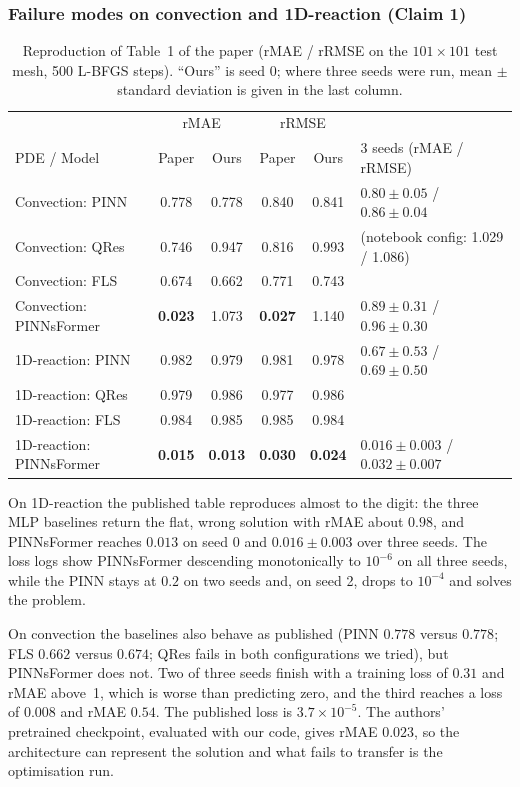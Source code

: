 \documentclass[10pt]{article} %
\begin{document}
\subsubsection{Failure modes on convection and 1D-reaction (Claim 1)}
\begin{table}[ht]
\caption{Reproduction of Table~1 of the paper (rMAE / rRMSE on the $101\times101$ test mesh, 500 L-BFGS steps). ``Ours'' is seed 0; where three seeds were run, mean $\pm$ standard deviation is given in the last column.}
\label{tab:table1}
\begin{center}
\small
\begin{tabular}{l cc cc l}
\toprule
 & \multicolumn{2}{c}{rMAE} & \multicolumn{2}{c}{rRMSE} & \\
PDE / Model & Paper & Ours & Paper & Ours & 3 seeds (rMAE / rRMSE) \\
\midrule
Convection: PINN        & 0.778 & 0.778 & 0.840 & 0.841 & $0.80\pm0.05$ / $0.86\pm0.04$ \\
Convection: QRes        & 0.746 & 0.947 & 0.816 & 0.993 & (notebook config: 1.029 / 1.086) \\
Convection: FLS         & 0.674 & 0.662 & 0.771 & 0.743 & \\
Convection: PINNsFormer & \textbf{0.023} & 1.073 & \textbf{0.027} & 1.140 & $0.89\pm0.31$ / $0.96\pm0.30$ \\
\midrule
1D-reaction: PINN        & 0.982 & 0.979 & 0.981 & 0.978 & $0.67\pm0.53$ / $0.69\pm0.50$ \\
1D-reaction: QRes        & 0.979 & 0.986 & 0.977 & 0.986 & \\
1D-reaction: FLS         & 0.984 & 0.985 & 0.985 & 0.984 & \\
1D-reaction: PINNsFormer & \textbf{0.015} & \textbf{0.013} & \textbf{0.030} & \textbf{0.024} & $0.016\pm0.003$ / $0.032\pm0.007$ \\
\bottomrule
\end{tabular}
\end{center}
\end{table}

On 1D-reaction the published table reproduces almost to the digit: the three MLP baselines return the flat, wrong solution with rMAE about $0.98$, and PINNsFormer reaches $0.013$ on seed 0 and $0.016\pm0.003$ over three seeds. The loss logs show PINNsFormer descending monotonically to $10^{-6}$ on all three seeds, while the PINN stays at $0.2$ on two seeds and, on seed 2, drops to $10^{-4}$ and solves the problem.

On convection the baselines also behave as published (PINN $0.778$ versus $0.778$; FLS $0.662$ versus $0.674$; QRes fails in both configurations we tried), but PINNsFormer does not. Two of three seeds finish with a training loss of $0.31$ and rMAE above~1, which is worse than predicting zero, and the third reaches a loss of $0.008$ and rMAE $0.54$. The published loss is $3.7\times10^{-5}$. The authors' pretrained checkpoint, evaluated with our code, gives rMAE $0.023$, so the architecture can represent the solution and what fails to transfer is the optimisation run.
\end{document}
